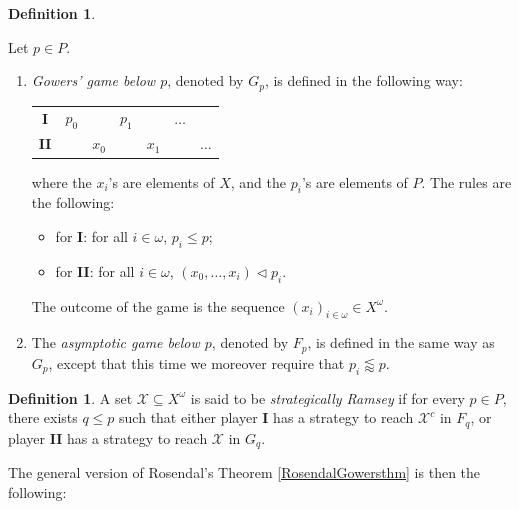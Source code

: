 \documentclass[a4paper,11pt]{article}
\theoremstyle{definition}
\newtheorem{defin}[thm]{Definition}
\numberwithin{equation}{section}
\newcommand{\X}{\mathcal{X}}
\newcommand{\I}{\textbf{I}}
\newcommand{\II}{\textbf{II}}
\begin{document}
\begin{defin}\label{DefGowersGames}

Let $p \in P$.

\begin{enumerate}

\item \emph{Gowers' game below $p$}, denoted by $G_p$, is defined in the following way:

\smallskip

\begin{tabular}{ccccccc}
\textbf{I} & $p_0$ & & $p_1$ & & $\hdots$ & \\
\textbf{II} & & $x_0$ & & $x_1$ & & $\hdots$ 
\end{tabular}

\smallskip

\noindent where the $x_i$'s are elements of $X$, and the $p_i$'s are elements of $P$. The rules are the following:

\begin{itemize}

\item for \textbf{I}: for all $i \in \omega$, $p_i \leqslant p$;

\item for \textbf{II}: for all $i \in \omega$, $(x_0, \ldots, x_i) \vartriangleleft p_i$.

\end{itemize}

\noindent The outcome of the game is the sequence $(x_i)_{i \in \omega} \in X^\omega$.

\item The \emph{asymptotic game below $p$}, denoted by $F_p$, is defined in the same way as $G_p$, except that this time we moreover require that $p_i \lessapprox p$.

\end{enumerate}

\end{defin}

\begin{defin}

A set $\X \subseteq X^\omega$ is said to be \emph{strategically Ramsey} if for every $p \in P$, there exists $q \leqslant p$ such that either player \I{} has a strategy to reach $\X^c$ in $F_q$, or player \II{} has a strategy to reach $\X$ in $G_q$.

\end{defin}

The general version of Rosendal's Theorem \ref{RosendalGowersthm} is then the following:
\end{document}
